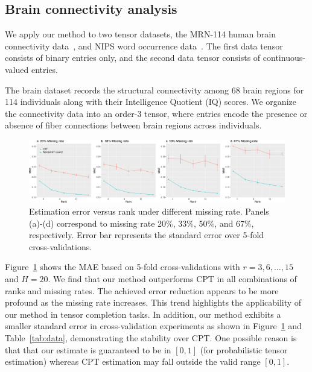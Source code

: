 \documentclass[twoside,11pt]{article}
\theoremstyle{definition}
\begin{document}
\subsection{Brain connectivity analysis}
We apply our method to two tensor datasets, the MRN-114 human brain connectivity data~\citep{wang2017bayesian}, and NIPS word occurrence data~\citep{globerson2007euclidean}. The first data tensor consists of binary entries only, and the second data tensor consists of continuous-valued entries. 

The brain dataset records the structural connectivity among 68 brain regions for 114 individuals along with their Intelligence Quotient (IQ) scores. We organize the connectivity data into an order-3 tensor, where entries encode the presence or absence of fiber connections between brain regions across individuals. 

\begin{figure}[h!]
\includegraphics[width = \textwidth]{figure/brain_sim.pdf}
\caption{Estimation error versus rank under different missing rate. Panels (a)-(d) correspond to missing rate 20\%, 33\%, 50\%, and 67\%, respectively. Error bar represents the standard error over 5-fold cross-validations.}\label{fig:braincv}
\end{figure}

Figure~\ref{fig:braincv} shows the MAE based on 5-fold cross-validations with $r = 3,6,\ldots, 15$ and $H = 20$. We find that our method outperforms CPT in all combinations of ranks and missing rates. The achieved error reduction appears to be more profound as the missing rate increases. This trend highlights the applicability of our method in tensor completion tasks. In addition, our method exhibits a smaller standard error in cross-validation experiments as shown in Figure~\ref{fig:braincv} and Table~\ref{tab:data}, demonstrating the stability over CPT.  One possible reason is that that our estimate is guaranteed to be in $[0,1]$ (for probabilistic tensor estimation) whereas CPT estimation may fall outside the valid range $[0,1]$. 
\end{document}
